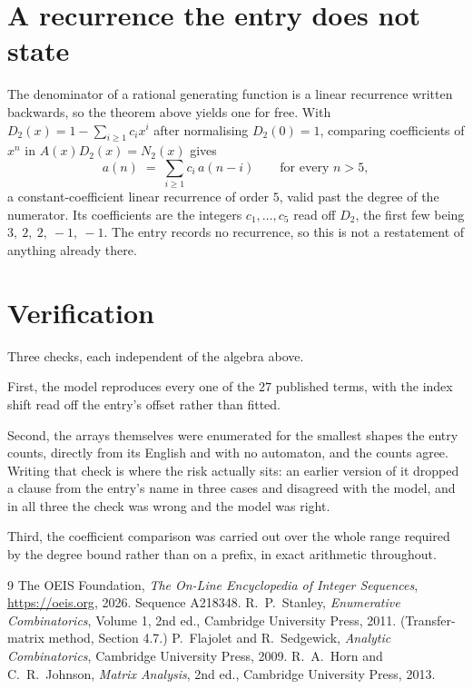 \documentclass[11pt,a4paper]{article}
\theoremstyle{plain}
\theoremstyle{definition}
\begin{document}
\section{A recurrence the entry does not state}

The denominator of a rational generating function is a linear recurrence written backwards, so
the theorem above yields one for free. With $D_2(x)=1-\sum_{i\ge1}c_ix^i$ after normalising
$D_2(0)=1$, comparing coefficients of $x^n$ in $A(x)D_2(x)=N_2(x)$ gives
\[
a(n)\;=\;\sum_{i\ge1}c_i\,a(n-i)\qquad\text{for every }n>5,
\]
a constant-coefficient linear recurrence of order $5$, valid past the degree of the
numerator. Its coefficients are the integers $c_1,\dots,c_{5}$ read off $D_2$, the first few being $3,\ 2,\ 2,\ -1,\ -1$. The entry records no recurrence, so this is not a restatement of anything
already there.

\section{Verification}

Three checks, each independent of the algebra above.

First, the model reproduces every one of the $27$ published terms, with the index shift
read off the entry's offset rather than fitted.

Second, the arrays themselves were enumerated for the smallest shapes the entry counts,
directly from its English and with no automaton, and the counts agree. Writing that check is
where the risk actually sits: an earlier version of it dropped a clause from the entry's name
in three cases and disagreed with the model, and in all three the check was wrong and the model
was right.

Third, the coefficient comparison was carried out over the whole range required by the degree
bound rather than on a prefix, in exact arithmetic throughout.

\begin{thebibliography}{9}
 The OEIS Foundation, \emph{The On-Line Encyclopedia of Integer
Sequences}, \url{https://oeis.org}, 2026. Sequence A218348.
 R.~P.~Stanley, \emph{Enumerative Combinatorics}, Volume 1, 2nd ed.,
Cambridge University Press, 2011. (Transfer-matrix method, Section 4.7.)
 P.~Flajolet and R.~Sedgewick, \emph{Analytic Combinatorics}, Cambridge
University Press, 2009.
 R.~A.~Horn and C.~R.~Johnson, \emph{Matrix Analysis}, 2nd ed., Cambridge
University Press, 2013.
\end{thebibliography}
\end{document}
